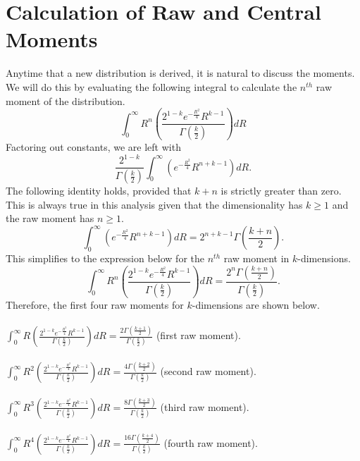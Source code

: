 \documentclass[11pt]{article} %
\begin{document}
\newpage

\section{Calculation of Raw and Central Moments}

\indent Anytime that a new distribution is derived, it is natural to discuss the moments.  We will do this by evaluating the following integral to calculate the $n^{th}$ raw moment of the distribution. \\
%
$$\int^\infty_0 R^n\left(\frac{2^{1-k}e^{-\frac{R^2}{4}}R^{k-1}}{\Gamma\left(\frac{k}{2}\right)}\right) dR$$
%
\indent
Factoring out constants, we are left with
%
$$\frac{2^{1-k}}{\Gamma\left(\frac{k}{2}\right)}
\int^\infty_0\left(e^{-\frac{R^2}{4}}R^{n+k-1}\right)dR.$$
%
\indent
The following identity holds, provided that $k+n$ is strictly greater than zero.  This is always true in this analysis given that the dimensionality has $k\ge1$ and the raw moment has $n\ge1$.
%
$$\int^\infty_0\left(e^{-\frac{R^2}{4}}R^{n+k-1}\right)dR=2^{n+k-1}\Gamma\left(\frac{k+n}{2}\right).$$
\indent This simplifies to the expression below for the $n^{th}$ raw moment in $k$-dimensions.
$$\int^\infty_0 R^n\left( \frac{2^{1-k}e^{-\frac{R^2}{4}}R^{k-1}}{\Gamma\left(\frac{k}{2}\right)}\right) dR
=\frac{2^n\Gamma\left(\frac{k+n}{2}\right)}{\Gamma\left(\frac{k}{2}\right)}.$$
\indent Therefore, the first four raw moments for $k$-dimensions are shown below. \\
\\
\indent
$\int^\infty_0 R\left( \frac{2^{1-k}e^{-\frac{R^2}{4}}R^{k-1}}{\Gamma\left(\frac{k}{2}\right)}\right) dR
=\frac{2\Gamma\left(\frac{k+1}{2}\right)}{\Gamma\left(\frac{k}{2}\right)}$  (first raw moment). \\ \\
\indent $\int^\infty_0 R^2\left( \frac{2^{1-k}e^{-\frac{R^2}{4}}R^{k-1}}{\Gamma\left(\frac{k}{2}\right)}\right) dR
=\frac{4\Gamma\left(\frac{k+2}{2}\right)}{\Gamma\left(\frac{k}{2}\right)}$  (second raw moment). \\ \\
\indent $\int^\infty_0 R^3\left( \frac{2^{1-k}e^{-\frac{R^2}{4}}R^{k-1}}{\Gamma\left(\frac{k}{2}\right)}\right) dR
=\frac{8\Gamma\left(\frac{k+3}{2}\right)}{\Gamma\left(\frac{k}{2}\right)}$  (third raw moment). \\ \\
\indent $\int^\infty_0 R^4\left( \frac{2^{1-k}e^{-\frac{R^2}{4}}R^{k-1}}{\Gamma\left(\frac{k}{2}\right)}\right) dR
=\frac{16\Gamma\left(\frac{k+4}{2}\right)}{\Gamma\left(\frac{k}{2}\right)}$  (fourth raw moment).
\end{document}
